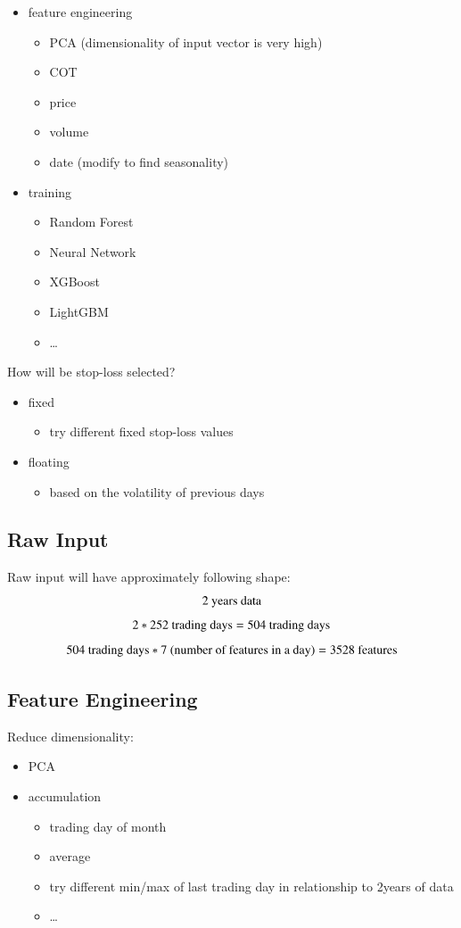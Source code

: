 \documentclass[final,2p]{elsarticle}
\begin{document}
\begin{itemize}
    \item feature engineering
    \begin{itemize}
        \item PCA (dimensionality of input vector is very high)
        \item COT
        \item price
        \item volume
        \item date (modify to find seasonality)
    \end{itemize}
    \item training
    \begin{itemize}
        \item Random Forest
        \item Neural Network
        \item XGBoost
        \item LightGBM
        \item \ldots
    \end{itemize}
\end{itemize}

How will be stop-loss selected?
\begin{itemize}
    \item fixed
        \begin{itemize}
            \item try different fixed stop-loss values
        \end{itemize}
    \item floating
        \begin{itemize}
            \item based on the volatility of previous days
        \end{itemize}
\end{itemize}

\subsection{Raw Input}
Raw input will have approximately following shape:
\[2 \textup{ years data}\]
\[2*252 \textup{ trading days} = 504\textup{ trading days}\]
\[504\textup{ trading days} * 7 \textup{ (number of features in a day)} = 3528 \textup{ features}\]

\subsection{Feature Engineering}
Reduce dimensionality:
\begin{itemize}
    \item PCA
    \item accumulation
        \begin{itemize}
            \item trading day of month
            \item average
            \item try different min/max of last trading day in relationship to 2years of data
            \item \ldots
        \end{itemize}
\end{itemize}
\end{document}

